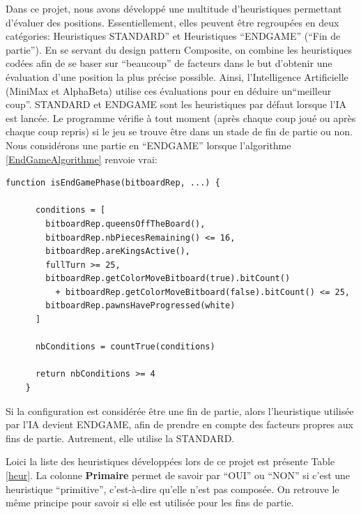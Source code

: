 \documentclass{article}
\begin{document}
Dans ce projet, nous avons développé une multitude d'heuristiques permettant d'évaluer des positions. Essentiellement, elles peuvent être regroupées
en deux catégories: Heuristiques STANDARD'' et Heuristiques ``ENDGAME'' (``Fin de partie''). En se servant du design pattern Composite, on combine les
heuristiques codées afin de se baser sur ``beaucoup'' de facteurs dans le but d'obtenir une évaluation d'une position la plus précise possible. Ainsi,
l'Intelligence Artificielle (MiniMax et AlphaBeta) utilise ces évaluations pour en déduire un``meilleur coup''. STANDARD et ENDGAME sont les 
heuristiques par défaut lorsque l'IA est lancée. Le programme vérifie à tout moment (après chaque coup joué ou après chaque coup repris)
si le jeu se trouve être dans un stade de fin de partie ou non.
Nous considérons une partie en ``ENDGAME'' lorsque l'algorithme \ref{EndGameAlgorithme} renvoie vrai:

\begin{lstlisting}[label={EndGameAlgorithme}, caption={Détection de la phase de fin de partie - pseudo-code}]
    function isEndGamePhase(bitboardRep, ...) {
    
      conditions = [
        bitboardRep.queensOffTheBoard(),
        bitboardRep.nbPiecesRemaining() <= 16,
        bitboardRep.areKingsActive(),
        fullTurn >= 25,
        bitboardRep.getColorMoveBitboard(true).bitCount()
          + bitboardRep.getColorMoveBitboard(false).bitCount() <= 25,
        bitboardRep.pawnsHaveProgressed(white)
      ]
    
      nbConditions = countTrue(conditions)
    
      return nbConditions >= 4
    }
    \end{lstlisting}

Si la configuration est considérée être une fin de partie, alors l'heuristique utilisée
par l'IA devient ENDGAME, afin de prendre en compte des facteurs propres aux fins de partie. Autrement, elle utilise la STANDARD.

Loici la liste des heuristiques développées lors de ce projet est présente Table \ref{heur}. La colonne \textbf{Primaire} permet de savoir
par ``OUI'' ou ``NON'' si c'est une heuristique ``primitive'', c'est-à-dire qu'elle n'est pas composée. On retrouve le même principe
pour savoir si elle est utilisée pour les fins de partie.
\end{document}

